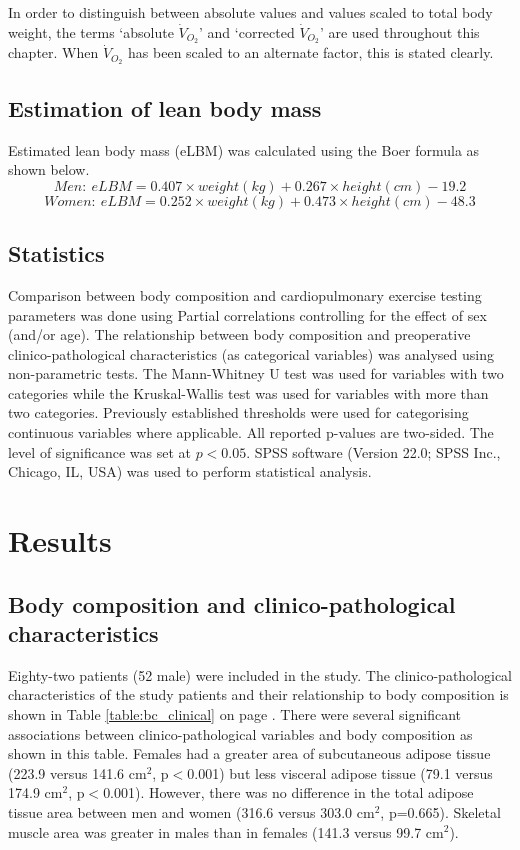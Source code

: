 In order to distinguish between absolute values and values scaled to total body weight, the terms `absolute $\dot{V}_{O_2}$' and `corrected $\dot{V}_{O_2}$' are used throughout this chapter. 
When $\dot{V}_{O_2}$ has been scaled to an alternate factor, this is stated clearly. 

\subsection{Estimation of lean body mass}
\label{sec:elbm}
Estimated lean body mass (eLBM) was calculated using the Boer formula \parencite{boer_estimated_1984} as shown below.
\begin{equation} \label{eq:elbm_men}
	Men:\ eLBM = 0.407 \times weight(kg) + 0.267 \times height(cm) - 19.2
\end{equation}
\begin{equation} \label{eq:elbm_women}
	Women:\ eLBM = 0.252 \times weight(kg) + 0.473 \times height(cm) - 48.3
\end{equation}

\subsection{Statistics} 
Comparison between body composition and cardiopulmonary exercise testing parameters was done using Partial correlations controlling for the effect of sex (and/or age). 
The relationship between body composition and preoperative clinico-pathological characteristics (as categorical variables) was analysed using non-parametric tests. 
The Mann-Whitney U test was used for variables with two categories while the Kruskal-Wallis test was used for variables with more than two categories. 
Previously established thresholds were used for categorising continuous variables where applicable. 
All reported p-values are two-sided. 
The level of significance was set at $p<0.05$.
SPSS software (Version 22.0; SPSS Inc., Chicago, IL, USA) was used to perform statistical analysis.

\clearpage
\section{Results}

\subsection{Body composition and clinico-pathological characteristics}
Eighty-two patients (52 male) were included in the study. 
The clinico-pathological characteristics of the study patients and their relationship to body composition is shown in Table \ref{table:bc_clinical} on page \pageref{table:bc_clinical}. 
There were several significant associations between clinico-pathological variables and body composition as shown in this table. 
Females had a greater area of subcutaneous adipose tissue (223.9 versus 141.6 cm$^2$, p$<$0.001) but less visceral adipose tissue (79.1 versus 174.9 cm$^2$, p$<$0.001).
However, there was no difference in the total adipose tissue area between men and women (316.6 versus 303.0 cm$^2$, p=0.665).
Skeletal muscle area was greater in males than in females (141.3 versus 99.7 cm$^2$).


